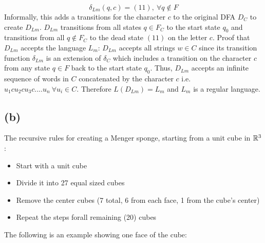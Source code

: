 \documentclass[12pt]{article}
\begin{document}
$$\delta_{Lm}(q, c) = (11) ,\: \forall q \notin F$$
Informally, this adds a transitions for the character $c$ to the original DFA
$D_C$ to create $D_{Lm}$. $D_{Lm}$ transitions from all states $q \in F_C$ to the
start state $q_0$ and transitions from all $q \notin F_C$ to the dead state
$(11)$ on the letter $c$.
\newline
\newline
Proof that $D_{Lm}$ accepts the language $L_m$:
\newline
\indent $D_{Lm}$ accepts all strings $w \in C$ since its transition function
$\delta_{Lm}$ is an extension of $\delta_C$ which includes a transition on the
character $c$ from any state $q \in F$ back to the start state $q_0$. Thus,
$D_{Lm}$ accepts an infinite sequence of words in $C$ concatenated by the
character $c$ i.e. $u_1cu_2cu_3c....u_n \: \forall u_i \in C$.
Therefore $L(D_{Lm}) = L_m$ and $L_m$ is a regular language.
\subsection*{(b)} The recursive rules for creating a Menger sponge, starting
from a unit cube in $\mathbb{R}^3$:
\begin{itemize}
\item Start with a unit cube
\item Divide it into 27 equal sized cubes
\item Remove the center cubes
(7 total, 6 from each face, 1 from the cube's center)
\item Repeat the steps forall remaining (20) cubes
\end{itemize}
The following is an example showing one face of the cube:
\newline
{}
\newline
{}
\end{document}
